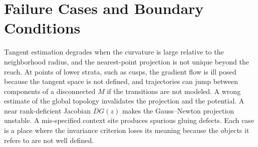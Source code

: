 \documentclass[11pt,a4paper]{article}
\theoremstyle{definition}
\theoremstyle{remark}
\begin{document}
\section{Failure Cases and Boundary Conditions}\label{app:failure}

Tangent estimation degrades when the curvature is large relative to the
neighborhood radius, and the nearest-point projection is not unique beyond
the reach. At points of lower strata, such as cusps, the gradient flow is
ill posed because the tangent space is not defined, and trajectories can
jump between components of a disconnected $M$ if the transitions are not
modeled. A wrong estimate of the global topology invalidates the projection
and the potential. A near rank-deficient Jacobian $DG(z)$ makes the
Gauss--Newton projection unstable. A mis-specified context site produces
spurious gluing defects. Each case is a place where the invariance criterion
loses its meaning because the objects it refers to are not well defined.
\end{document}
